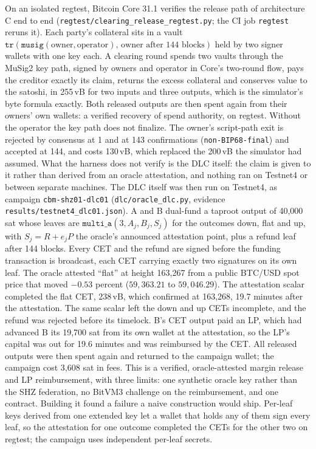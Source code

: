 On an isolated regtest, Bitcoin Core 31.1 verifies the release path of architecture C end to end (\texttt{regtest/\allowbreak{}clearing\_\allowbreak{}release\_\allowbreak{}regtest.py}; the CI job \texttt{regtest} reruns it). Each party's collateral sits in a vault $\mathtt{tr}(\mathtt{musig}(\text{owner},\text{operator}),\,\text{owner after 144 blocks})$ held by two signer wallets with one key each. A clearing round spends two vaults through the MuSig2 key path, signed by owners and operator in Core's two-round flow, pays the creditor exactly its claim, returns the excess collateral and conserves value to the satoshi, in 255\,vB for two inputs and three outputs, which is the simulator's byte formula exactly. Both released outputs are then spent again from their owners' own wallets: a verified recovery of spend authority, on regtest. Without the operator the key path does not finalize. The owner's script-path exit is rejected by consensus at 1 and at 143 confirmations (\texttt{non-BIP68-final}) and accepted at 144, and costs 130\,vB, which replaced the 200\,vB the simulator had assumed. What the harness does not verify is the DLC itself: the claim is given to it rather than derived from an oracle attestation, and nothing ran on Testnet4 or between separate machines. The DLC itself was then run on Testnet4, as campaign \texttt{cbm-shz01-dlc01} (\texttt{dlc/\allowbreak{}oracle\_\allowbreak{}dlc.py}, evidence \texttt{results/\allowbreak{}testnet4\_\allowbreak{}dlc01.json}). A and B dual-fund a taproot output of 40{,}000 sat whose leaves are $\mathtt{multi\_a}(3,A_j,B_j,S_j)$ for the outcomes down, flat and up, with $S_j=R+e_jP$ the oracle's announced attestation point, plus a refund leaf after 144 blocks. Every CET and the refund are signed before the funding transaction is broadcast, each CET carrying exactly two signatures on its own leaf. The oracle attested ``flat'' at height 163{,}267 from a public BTC/USD spot price that moved $-0.53$ percent ($59{,}363.21$ to $59{,}046.29$). The attestation scalar completed the flat CET, 238\,vB, which confirmed at 163{,}268, 19.7 minutes after the attestation. The same scalar left the down and up CETs incomplete, and the refund was rejected before its timelock. B's CET output paid an LP, which had advanced B its 19{,}700 sat from its own wallet at the attestation, so the LP's capital was out for 19.6 minutes and was reimbursed by the CET. All released outputs were then spent again and returned to the campaign wallet; the campaign cost 3{,}608 sat in fees. This is a verified, oracle-attested margin release and LP reimbursement, with three limits: one synthetic oracle key rather than the SHZ federation, no BitVM3 challenge on the reimbursement, and one contract. Building it found a failure a naive construction would ship. Per-leaf keys derived from one extended key let a wallet that holds any of them sign every leaf, so the attestation for one outcome completed the CETs for the other two on regtest; the campaign uses independent per-leaf secrets.

